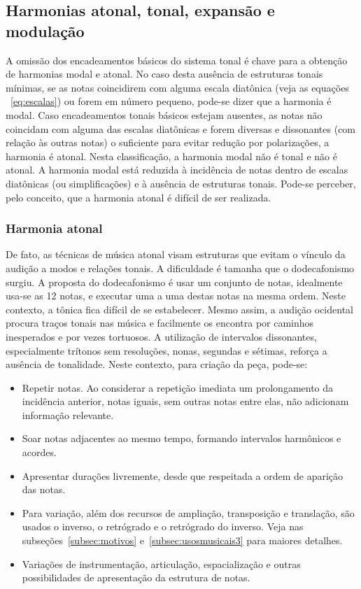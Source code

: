 \subsection{Harmonias atonal, tonal, expansão e modulação}\label{subsec:harmonia}
A omissão dos encadeamentos básicos do sistema tonal é chave para a obtenção de 
harmonias modal e atonal. No caso desta ausência de estruturas tonais mínimas,
se as notas coincidirem com alguma escala diatônica (veja as equações ~\ref{eq:escalas})
ou forem em número pequeno, pode-se dizer que a
harmonia é modal. Caso encadeamentos tonais básicos estejam ausentes, as notas não coincidam
com alguma das escalas diatônicas e forem diversas e dissonantes (com relação às outras notas) o suficiente para evitar redução por
polarizações, a harmonia é atonal.
Nesta classificação, a harmonia modal não é tonal e não é atonal.
A harmonia modal está reduzida à incidência de notas dentro de escalas diatônicas (ou simplificações) e à ausência de estruturas tonais.
Pode-se perceber, pelo conceito, que a harmonia atonal é difícil de ser realizada.\cite{harmEXT}

\subsubsection{Harmonia atonal}
De fato, as técnicas de música atonal
visam estruturas que evitam o vínculo da audição a modos e relações tonais. A
dificuldade é tamanha que o dodecafonismo surgiu. A proposta do dodecafonismo é
usar um conjunto de notas, idealmente usa-se as 12 notas, e executar uma a uma destas notas
na mesma ordem. Neste contexto, a tônica fica difícil de se estabelecer. Mesmo assim, a audição ocidental
procura traços tonais nas música e facilmente os encontra por caminhos inesperados e por vezes tortuosos.
A utilização de
intervalos dissonantes, especialmente trítonos sem resoluções, nonas, segundas e sétimas, reforça
a ausência de tonalidade. Neste contexto, para criação da peça, pode-se:
\begin{itemize}
    \item Repetir notas. Ao considerar a repetição imediata um prolongamento da incidência anterior, notas iguais, sem outras notas entre elas, não adicionam informação relevante.
    \item Soar notas adjacentes ao mesmo tempo, formando intervalos harmônicos e acordes.
    \item Apresentar durações livremente, desde que respeitada a ordem de aparição das notas.
    \item Para variação, além dos recursos de ampliação, transposição e translação, são usados o inverso, o retrógrado e o retrógrado do inverso. Veja nas subseções~\ref{subsec:motivos} e~\ref{subsec:usosmusicais3} para maiores detalhes.
    \item Variações de instrumentação, articulação, espacialização e outras possibilidades de apresentação da estrutura de notas.
\end{itemize}

